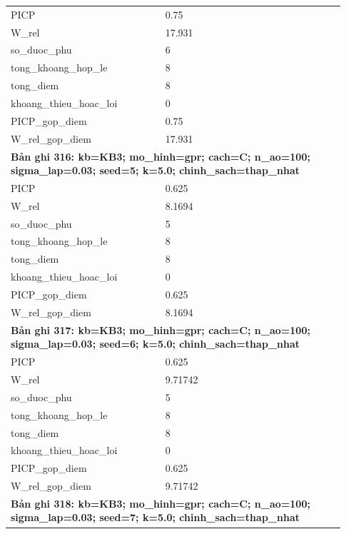 \begin{longtable}{p{0.43\linewidth}p{0.50\linewidth}}
PICP & 0.75 \\
W\_\allowbreak rel & 17.931 \\
so\_\allowbreak duoc\_\allowbreak phu & 6 \\
tong\_\allowbreak khoang\_\allowbreak hop\_\allowbreak le & 8 \\
tong\_\allowbreak diem & 8 \\
khoang\_\allowbreak thieu\_\allowbreak hoac\_\allowbreak loi & 0 \\
PICP\_\allowbreak gop\_\allowbreak diem & 0.75 \\
W\_\allowbreak rel\_\allowbreak gop\_\allowbreak diem & 17.931 \\
\midrule
\multicolumn{2}{p{0.95\linewidth}}{\textbf{Bản ghi 316: kb=KB3; mo\_hinh=gpr; cach=C; n\_ao=100; sigma\_lap=0.03; seed=5; k=5.0; chinh\_sach=thap\_nhat}} \\
PICP & 0.625 \\
W\_\allowbreak rel & 8.1694 \\
so\_\allowbreak duoc\_\allowbreak phu & 5 \\
tong\_\allowbreak khoang\_\allowbreak hop\_\allowbreak le & 8 \\
tong\_\allowbreak diem & 8 \\
khoang\_\allowbreak thieu\_\allowbreak hoac\_\allowbreak loi & 0 \\
PICP\_\allowbreak gop\_\allowbreak diem & 0.625 \\
W\_\allowbreak rel\_\allowbreak gop\_\allowbreak diem & 8.1694 \\
\midrule
\multicolumn{2}{p{0.95\linewidth}}{\textbf{Bản ghi 317: kb=KB3; mo\_hinh=gpr; cach=C; n\_ao=100; sigma\_lap=0.03; seed=6; k=5.0; chinh\_sach=thap\_nhat}} \\
PICP & 0.625 \\
W\_\allowbreak rel & 9.71742 \\
so\_\allowbreak duoc\_\allowbreak phu & 5 \\
tong\_\allowbreak khoang\_\allowbreak hop\_\allowbreak le & 8 \\
tong\_\allowbreak diem & 8 \\
khoang\_\allowbreak thieu\_\allowbreak hoac\_\allowbreak loi & 0 \\
PICP\_\allowbreak gop\_\allowbreak diem & 0.625 \\
W\_\allowbreak rel\_\allowbreak gop\_\allowbreak diem & 9.71742 \\
\midrule
\multicolumn{2}{p{0.95\linewidth}}{\textbf{Bản ghi 318: kb=KB3; mo\_hinh=gpr; cach=C; n\_ao=100; sigma\_lap=0.03; seed=7; k=5.0; chinh\_sach=thap\_nhat}} \\

\end{longtable}
